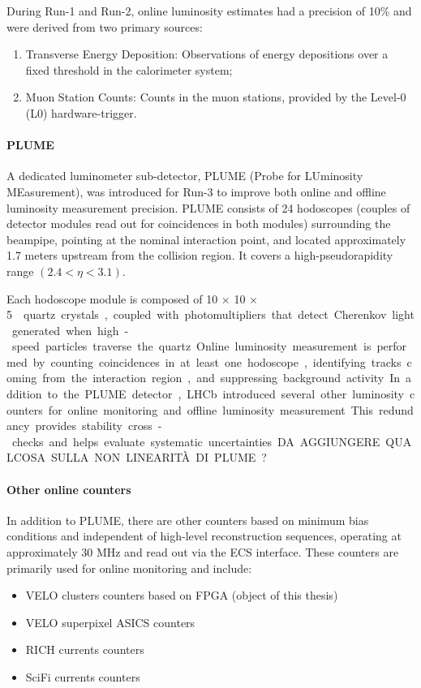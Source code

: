 During Run-1 and Run-2, online luminosity estimates had a precision of 10\% and were derived from two primary sources: 
\begin{enumerate}
    \item Transverse Energy Deposition: Observations of energy depositions over a fixed threshold in the calorimeter system;
    \item Muon Station Counts: Counts in the muon stations, provided by the Level-0 (L0) hardware-trigger.
\end{enumerate}
\paragraph{PLUME}
A dedicated luminometer sub-detector, PLUME (Probe for LUminosity MEasurement), was introduced for Run-3 to improve both online and offline luminosity measurement precision. PLUME consists of 24 hodoscopes (couples of detector modules read out for coincidences in both modules) surrounding the beampipe, pointing at the nominal interaction point, and located approximately 1.7 meters upstream from the collision region. It covers a high-pseudorapidity range $(2.4 < \eta < 3.1)$.

Each hodoscope module is composed of 10 × 10 × \SI{5}{\milli\meter\cubic} quartz crystals, coupled with photomultipliers that detect Cherenkov light generated when high-speed particles traverse the quartz. Online luminosity measurement is performed by counting coincidences in at least one hodoscope, identifying tracks coming from the interaction region, and suppressing background activity.
In addition to the PLUME detector, LHCb introduced several other luminosity counters for online monitoring and offline luminosity measurement. This redundancy provides stability cross-checks and helps evaluate systematic uncertainties.

DA AGGIUNGERE QUALCOSA SULLA NON LINEARITÀ DI PLUME?

\paragraph{Other online counters} 
In addition to PLUME, there are other counters based on minimum bias conditions and independent of high-level reconstruction sequences, operating at approximately 30 MHz and read out via the ECS interface. These counters are primarily used for online monitoring and include:
\begin{itemize}
   \item VELO clusters counters based on FPGA (object of this thesis)
   \item VELO superpixel ASICS counters
   \item RICH currents counters
   \item SciFi currents counters
\end{itemize}

